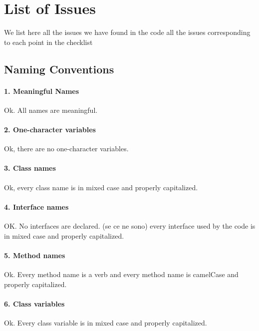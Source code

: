 \documentclass[english]{article}
\begin{document}
\section{List of Issues} %
We list here all the issues we have found in the code
all the issues corresponding to each point in the checklist


\subsection{Naming Conventions}

\paragraph{1. Meaningful Names}
Ok. All names are meaningful.

\paragraph{2. One-character variables}
Ok, there are no one-character variables.

\paragraph{3. Class names}
Ok, every class name is in mixed case and properly capitalized.

\paragraph{4. Interface names}
OK. No interfaces are declared.
(se ce ne sono) every interface used by the code is in mixed case and properly capitalized.

\paragraph{5. Method names}
Ok. Every method name is a verb and every method name is camelCase and properly capitalized.

\paragraph{6. Class variables}
Ok. Every class variable is in mixed case and properly capitalized.
\end{document}
